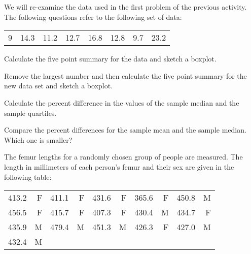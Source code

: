 
\begin{problem}

\item We will re-examine the data used in the first problem of the
  previous activity. The following questions refer to the following set of data: \\
  \begin{tabular}{rrrrrrrr}
    9 & 14.3 & 11.2 & 12.7 & 16.8 & 12.8 & 9.7 & 23.2
  \end{tabular}

  \begin{subproblem}
  \item Calculate the five point summary for the data and sketch a boxplot.

    \vfill

  \item Remove the largest number and then calculate the five point
    summary for the new data set and sketch a boxplot.

    \vfill

  \item Calculate the percent difference in the values of the sample
    median and the sample quartiles.

    \vspace{4em}

  \item Compare the percent differences for the sample mean and the
    sample median. Which one is smaller?

    \vspace{4em}

  \end{subproblem}

  \clearpage

\item The femur lengths for a randomly chosen group of people are
  measured. The length in millimeters of each person's femur and their
  sex are given in the following table: \\
  \begin{tabular}{rr|rr|rr|rr|rr}
    413.2 & F & 411.1 & F & 431.6 & F & 365.6 & F & 450.8 & M \\
    456.5 & F & 415.7 & F & 407.3 & F & 430.4 & M & 434.7 & F \\
    435.9 & M & 479.4 & M & 451.3 & M & 426.3 & F & 427.0 & M \\
    432.4 & M
  \end{tabular}


\end{problem}
